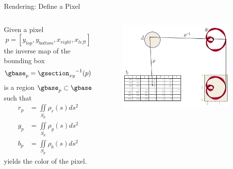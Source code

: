 \documentclass[xcolor={dvipsnames}, handout]{beamer}
\begin{document}
\begin{frame}{Rendering: Define a Pixel}
    \begin{columns}
        Given a pixel
        \begin{equation}
        p=\left[y_{top}, y_{bottom}, x_{right}, x_{left}\right]
        \end{equation}
        the inverse map of the bounding box 
        \begin{equation}
        \gbase_{p} ={\gsection_{xy}}^{-1}(p)
        \end{equation}
        is a region $\gbase_p \subset \gbase$ such that 
        \begin{align}
            \scriptstyle r_p &= \scriptstyle \iint\limits_{S_p} \rho_r(s)ds^{2}\\
            \scriptstyle g_p &= \scriptstyle \iint\limits_{S_p} \rho_g(s)ds^{2}\\
            \scriptstyle  b_p &= \scriptstyle \iint\limits_{S_p} \rho_b(s)ds^{2}
        \end{align}
        yields the color of the pixel. 
        \begin{figure}[H]
            \includegraphics[width=\textwidth]{figures/math/render.png}
        \end{figure}
    \end{columns}
\end{frame}
\end{document}
